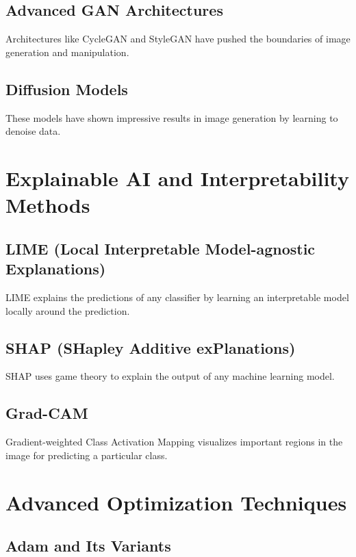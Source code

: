 \subsection{Advanced GAN Architectures}

Architectures like CycleGAN and StyleGAN have pushed the boundaries of
image generation and manipulation.

\subsection{Diffusion Models}

These models have shown impressive results in image generation by
learning to denoise data.

\section{Explainable AI and Interpretability Methods}

\subsection{LIME (Local Interpretable Model-agnostic Explanations)}

LIME explains the predictions of any classifier by learning an
interpretable model locally around the prediction.

\subsection{SHAP (SHapley Additive exPlanations)}

SHAP uses game theory to explain the output of any machine learning
model.

\subsection{Grad-CAM}

Gradient-weighted Class Activation Mapping visualizes important regions
in the image for predicting a particular class.

\section{Advanced Optimization Techniques}

\subsection{Adam and Its Variants}

